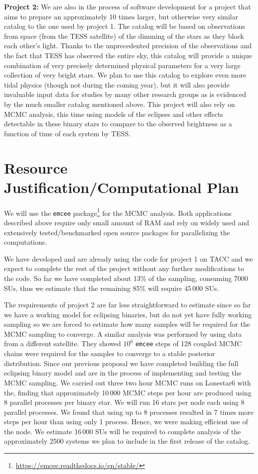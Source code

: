 \documentclass[12pt]{article}
\begin{document}
\textbf{Project 2:} We are also in the process of software development for a
project that aims to prepare an approximately 10 times larger, but otherwise
very similar catalog to the one used by project 1. The catalog will be based on
observations from space (from the TESS satellite) of the dimming of the stars as
they block each other's light. Thanks to the unprecedented precision of the
observations and the fact that TESS has observed the entire sky, this catalog
will provide a unique combination of very precisely determined physical
parameters for a very large collection of very bright stars.  We plan to use
this catalog to explore even more tidal physics (though not during the coming
year), but it will also provide invaluable input data for studies by many other
research groups as is evidenced by the much smaller catalog mentioned above.
This project will also rely on MCMC analysis, this time using models of the
eclipses and other effects detectable in these binary stars to compare to the
observed brightness as a function of time of each system by TESS.

\section{Resource Justification/Computational Plan}

We will use the \texttt{emcee}
package\footnote{\url{https://emcee.readthedocs.io/en/stable/}} for the MCMC
analysis. Both applications described above require only small amount of RAM and
rely on widely used and extensively tested/benchmarked open source packages for
parallelizing the computations.

We have developed and are already using the code for project 1 on TACC and we
expect to complete the rest of the project without any further modifications to
the code. So far we have completed about 13\% of the sampling, consuming 7000
SUs, thus we estimate that the remaining 85\% will require 45\,000 SUs.

The requirements of project 2 are far less straightforward to estimate since so
far we have a working model for eclipsing binaries, but do not yet have fully
working sampling so we are forced to estimate how many samples will be required
for the MCMC sampling to converge. A similar analysis was performed by
\citet{Windemuth_et_al_19} using data from a different satellite. They showed
$10^6$ \texttt{emcee} steps of 128 coupled MCMC chains were required for the
samples to converge to a stable posterior distribution. Since our previous
proposal we have completed building the full eclipsing binary model and are in
the process of implementing and testing the MCMC sampling. We carried out three
two hour MCMC runs on Lonestar6 with the, finding that approximately 10\,000
MCMC steps per hour are produced using 8 parallel processes per binary star. We
will run 16 stars per node each using 8 parallel processes. We found that using
up to 8 processes resulted in 7 times more steps per hour than using only 1
process. Hence, we were making efficient use of the node. We estimate 16\,000
SUs will be required to complete analysis of the approximately 2500 systems we
plan to include in the first release of the catalog.
\end{document}
